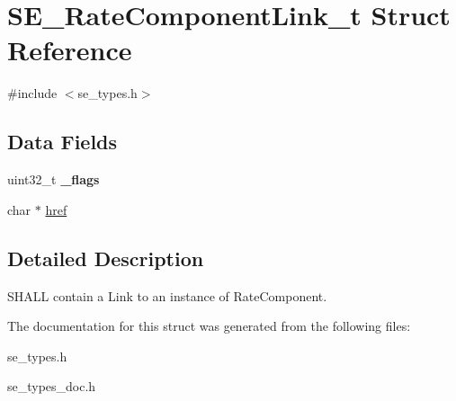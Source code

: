 \hypertarget{structSE__RateComponentLink__t}{}\section{S\+E\+\_\+\+Rate\+Component\+Link\+\_\+t Struct Reference}
\label{structSE__RateComponentLink__t}


{\ttfamily \#include $<$se\+\_\+types.\+h$>$}

\subsection*{Data Fields}
\begin{DoxyCompactItemize}
\item 
uint32\+\_\+t {\bfseries \+\_\+flags}
\item 
char $\ast$ \hyperlink{group__RateComponentLink_ga9b15f31245892969d5eb7efb8f1a42b4}{href}
\end{DoxyCompactItemize}


\subsection{Detailed Description}
S\+H\+A\+LL contain a Link to an instance of Rate\+Component. 

The documentation for this struct was generated from the following files\+:\begin{DoxyCompactItemize}
\item 
se\+\_\+types.\+h\item 
se\+\_\+types\+\_\+doc.\+h\end{DoxyCompactItemize}
